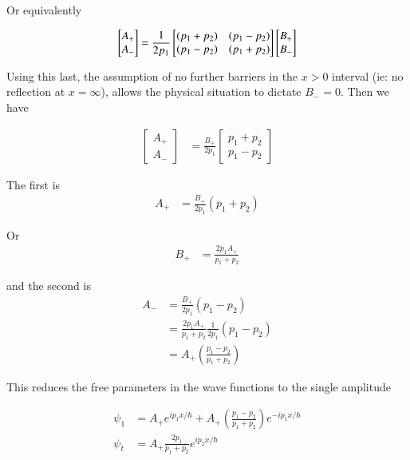 Or equivalently

\begin{align*}
\begin{bmatrix}
A_{+} \\
A_{-}
\end{bmatrix}
&=
\frac{1}{2p_1}
\begin{bmatrix}
(p_1 + p_2) & (p_1 - p_2) \\
(p_1 - p_2) & (p_1 + p_2)
\end{bmatrix}
\begin{bmatrix}
B_{+} \\
B_{-}
\end{bmatrix} \\
\end{align*}

Using this last, the
assumption of no further barriers in the $x>0$ interval (ie: no reflection at
$x = \infty$), allows the physical situation to dictate $B_{-} = 0$.  Then we
have

\begin{align*}
\begin{bmatrix}
A_{+} \\
A_{-}
\end{bmatrix}
&=
\frac{B_{+} }{2p_1}
\begin{bmatrix}
p_1 + p_2 \\
p_1 - p_2
\end{bmatrix}
\end{align*}

The first is
\begin{align*}
A_{+}
&=
\frac{B_{+} }{2p_1} (p_1 + p_2)
\end{align*}

Or
\begin{align*}
B_{+}
&=
\frac{2 p_1 A_{+} }{p_1 + p_2}
\end{align*}

and the second is
\begin{align*}
A_{-}
&=
\frac{B_{+} }{2p_1} (p_1 - p_2) \\
&=
\frac{2 p_1 A_{+} }{p_1 + p_2}
\frac{1}{2p_1} (p_1 - p_2) \\
&=
A_{+} \left(
\frac{ p_1 - p_2 }{p_1 + p_2} \right)
\end{align*}

This reduces the free parameters in the wave functions to the single
amplitude

\begin{align}\label{eqn:bohm11:wavefunctions}
\psi_1 &=
A_{+} e^{ i p_1 x/\hbar }
+A_{+} \left(
\frac{ p_1 - p_2 }{p_1 + p_2} \right)
e^{ -i p_1 x/\hbar } \\
\psi_t &= A_{+} \frac{2 p_1 }{p_1 + p_2} e^{ i p_2 x/\hbar }
\end{align}

